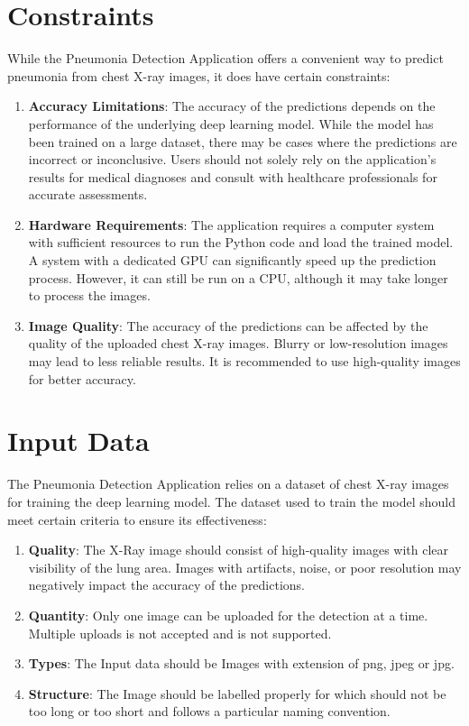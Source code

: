 \section{Constraints}

While the Pneumonia Detection Application offers a convenient way to predict pneumonia from chest X-ray images, it does have certain constraints:

\begin{enumerate}
	\item \textbf{Accuracy Limitations}: The accuracy of the predictions depends on the performance of the underlying deep learning model. While the model has been trained on a large dataset, there may be cases where the predictions are incorrect or inconclusive. Users should not solely rely on the application's results for medical diagnoses and consult with healthcare professionals for accurate assessments.
	\item \textbf{Hardware Requirements}: The application requires a computer system with sufficient resources to run the Python code and load the trained model. A system with a dedicated GPU can significantly speed up the prediction process. However, it can still be run on a CPU, although it may take longer to process the images.
	\item \textbf{Image Quality}: The accuracy of the predictions can be affected by the quality of the uploaded chest X-ray images. Blurry or low-resolution images may lead to less reliable results. It is recommended to use high-quality images for better accuracy.
\end{enumerate}

\section{Input Data}

The Pneumonia Detection Application relies on a dataset of chest X-ray images for training the deep learning model. The dataset used to train the model should meet certain criteria to ensure its effectiveness:

\begin{enumerate}
	\item \textbf{Quality}: The X-Ray image should consist of high-quality images with clear visibility of the lung area. Images with artifacts, noise, or poor resolution may negatively impact the accuracy of the predictions.
	\item \textbf{Quantity}: Only one image can be uploaded for the detection at a time. Multiple uploads is not accepted and is not supported.
	\item \textbf{Types}: The Input data should be Images with extension of png, jpeg or jpg.
	\item \textbf{Structure}: The Image should be labelled properly for which should not be too long or too short and follows a particular naming convention.
\end{enumerate}

